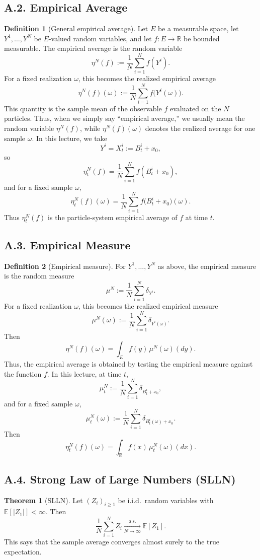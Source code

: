 \documentclass[11pt]{article}
\theoremstyle{definition}
\newtheorem{definition}{Definition}
\newtheorem{theorem}{Theorem}
\theoremstyle{remark}
\begin{document}
\subsection*{A.2. Empirical Average}
\begin{definition}[General empirical average]
Let $E$ be a measurable space, let $Y^1,\dots,Y^N$ be $E$-valued random variables, and let $f:E\to\mathbb R$ be bounded measurable. The empirical average is the random variable
\[
\eta^N(f):=\frac{1}{N}\sum_{i=1}^N f(Y^i).
\]
For a fixed realization $\omega$, this becomes the realized empirical average
\[
\eta^N(f)(\omega):=\frac{1}{N}\sum_{i=1}^N f\bigl(Y^i(\omega)\bigr).
\]
This quantity is the sample mean of the observable $f$ evaluated on the $N$ particles. Thus, when we simply say ``empirical average,'' we usually mean the random variable $\eta^N(f)$, while $\eta^N(f)(\omega)$ denotes the realized average for one sample $\omega$.
In this lecture, we take
\[
Y^i=X_t^i:=B_t^i+x_0,
\]
so
\[
\eta_t^N(f)=\frac{1}{N}\sum_{i=1}^N f(B_t^i+x_0),
\]
and for a fixed sample $\omega$,
\[
\eta_t^N(f)(\omega)=\frac{1}{N}\sum_{i=1}^N f\bigl(B_t^i+x_0\bigr)(\omega).
\]
Thus $\eta_t^N(f)$ is the particle-system empirical average of $f$ at time $t$.
\end{definition}

\subsection*{A.3. Empirical Measure}
\begin{definition}[Empirical measure]
For $Y^1,\dots,Y^N$ as above, the empirical measure is the random measure
\[
\mu^N:=\frac{1}{N}\sum_{i=1}^N \delta_{Y^i}.
\]
For a fixed realization $\omega$, this becomes the realized empirical measure
\[
\mu^N(\omega):=\frac{1}{N}\sum_{i=1}^N \delta_{Y^i(\omega)}.
\]
Then
\[
\eta^N(f)(\omega)=\int_E f(y)\,\mu^N(\omega)(dy).
\]
Thus, the empirical average is obtained by testing the empirical measure against the function $f$. In this lecture, at time $t$,
\[
\mu_t^N:=\frac{1}{N}\sum_{i=1}^N \delta_{B_t^i+x_0},
\]
and for a fixed sample $\omega$,
\[
\mu_t^N(\omega):=\frac{1}{N}\sum_{i=1}^N \delta_{B_t^i(\omega)+x_0}.
\]
Then
\[
\eta_t^N(f)(\omega)=\int_{\mathbb R} f(x)\,\mu_t^N(\omega)(dx).
\]
\end{definition}

\subsection*{A.4. Strong Law of Large Numbers (SLLN)}
\begin{theorem}[SLLN]
Let $(Z_i)_{i\ge1}$ be i.i.d.\ random variables with $\mathbb E[|Z_1|]<\infty$. Then
\[
\frac{1}{N}\sum_{i=1}^N Z_i
\xrightarrow[N\to\infty]{\text{a.s.}}
\mathbb E[Z_1].
\]
This says that the sample average converges almost surely to the true expectation.
\end{theorem}
\end{document}
